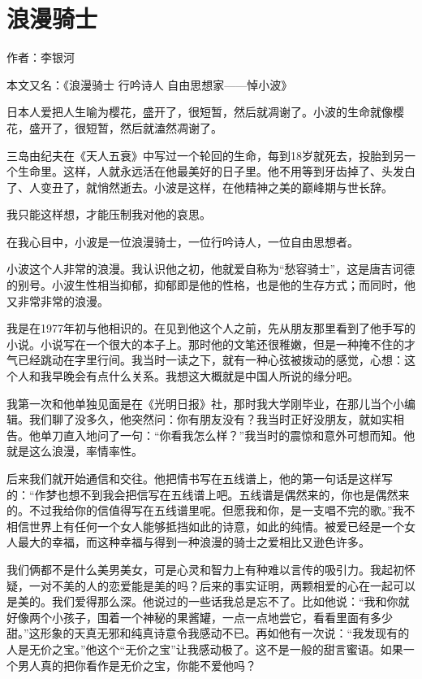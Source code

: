 \chapter{浪漫骑士}

作者：李银河 

本文又名：《浪漫骑士 行吟诗人 自由思想家——悼小波》 

日本人爱把人生喻为樱花，盛开了，很短暂，然后就凋谢了。小波的生命就像樱花，盛开了，很短暂，然后就溘然凋谢了。 

三岛由纪夫在《天人五衰》中写过一个轮回的生命，每到18岁就死去，投胎到另一个生命里。这样，人就永远活在他最美好的日子里。他不用等到牙齿掉了、头发白了、人变丑了，就悄然逝去。小波是这样，在他精神之美的巅峰期与世长辞。 

我只能这样想，才能压制我对他的哀思。 

在我心目中，小波是一位浪漫骑士，一位行吟诗人，一位自由思想者。 

小波这个人非常的浪漫。我认识他之初，他就爱自称为“愁容骑士”，这是唐吉诃德的别号。小波生性相当抑郁，抑郁即是他的性格，也是他的生存方式；而同时，他又非常非常的浪漫。 

我是在1977年初与他相识的。在见到他这个人之前，先从朋友那里看到了他手写的小说。小说写在一个很大的本子上。那时他的文笔还很稚嫩，但是一种掩不住的才气已经跳动在字里行间。我当时一读之下，就有一种心弦被拨动的感觉，心想：这个人和我早晚会有点什么关系。我想这大概就是中国人所说的缘分吧。 

我第一次和他单独见面是在《光明日报》社，那时我大学刚毕业，在那儿当个小编辑。我们聊了没多久，他突然问：你有朋友没有？我当时正好没朋友，就如实相告。他单刀直入地问了一句：“你看我怎么样？”我当时的震惊和意外可想而知。他就是这么浪漫，率情率性。 

后来我们就开始通信和交往。他把情书写在五线谱上，他的第一句话是这样写的：“作梦也想不到我会把信写在五线谱上吧。五线谱是偶然来的，你也是偶然来的。不过我给你的信值得写在五线谱里呢。但愿我和你，是一支唱不完的歌。”我不相信世界上有任何一个女人能够抵挡如此的诗意，如此的纯情。被爱已经是一个女人最大的幸福，而这种幸福与得到一种浪漫的骑士之爱相比又逊色许多。 

我们俩都不是什么美男美女，可是心灵和智力上有种难以言传的吸引力。我起初怀疑，一对不美的人的恋爱能是美的吗？后来的事实证明，两颗相爱的心在一起可以是美的。我们爱得那么深。他说过的一些话我总是忘不了。比如他说：“我和你就好像两个小孩子，围着一个神秘的果酱罐，一点一点地尝它，看看里面有多少甜。”这形象的天真无邪和纯真诗意令我感动不已。再如他有一次说：“我发现有的人是无价之宝。”他这个“无价之宝”让我感动极了。这不是一般的甜言蜜语。如果一个男人真的把你看作是无价之宝，你能不爱他吗？ 

